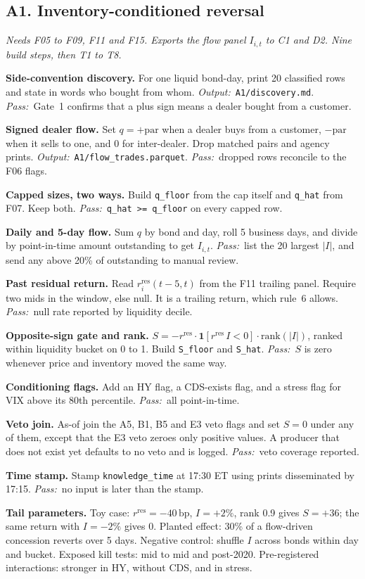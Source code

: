 \documentclass[11pt,letterpaper]{article}
\makeatletter
\newcommand{\code}[1]{\texttt{#1}}
\newcommand{\ind}[1]{\mathbf{1}\!\left[#1\right]}
\newcommand{\bp}{\,\mathrm{bp}}
\newcommand{\rres}{r^{\mathrm{res}}}      %
\newcommand*{\twodigit}[1]{\expandafter\@twodigit\csname c@#1\endcsname}
\newcommand*{\@twodigit}[1]{\ifnum#1<10 0\fi\number#1}
\newcommand{\stepname}[1]{\textbf{#1.}}
\newcommand{\Out}{\textit{Output:}~}
\newcommand{\Pass}{\textit{Pass:}~}
\makeatother
\begin{document}
\subsection{A1. Inventory-conditioned reversal}
\emph{Needs F05 to F09, F11 and F15. Exports the flow panel $I_{i,t}$ to C1 and D2. Nine build steps, then T1 to T8.}
\begin{ladder}[label=\textbf{A1.\twodigit*}]
\item \stepname{Side-convention discovery} For one liquid bond-day, print 20 classified rows and state in words who bought from whom. \Out \code{A1/discovery.md}. \Pass Gate~1 confirms that a plus sign means a dealer bought from a customer.
\item \stepname{Signed dealer flow} Set $q=+\mathrm{par}$ when a dealer buys from a customer, $-\mathrm{par}$ when it sells to one, and 0 for inter-dealer. Drop matched pairs and agency prints. \Out \code{A1/flow_trades.parquet}. \Pass dropped rows reconcile to the F06 flags.
\item \stepname{Capped sizes, two ways} Build \code{q_floor} from the cap itself and \code{q_hat} from F07. Keep both. \Pass \code{q_hat >= q_floor} on every capped row.
\item \stepname{Daily and 5-day flow} Sum $q$ by bond and day, roll 5 business days, and divide by point-in-time amount outstanding to get $I_{i,t}$. \Pass list the 20 largest $|I|$, and send any above 20\% of outstanding to manual review.
\item \stepname{Past residual return} Read $\rres_i(t-5,t)$ from the F11 trailing panel. Require two mids in the window, else null. It is a trailing return, which rule~6 allows. \Pass null rate reported by liquidity decile.
\item \stepname{Opposite-sign gate and rank} $S=-\rres\cdot\ind{\rres\,I<0}\cdot\mathrm{rank}(|I|)$, ranked within liquidity bucket on 0 to 1. Build \code{S_floor} and \code{S_hat}. \Pass $S$ is zero whenever price and inventory moved the same way.
\item \stepname{Conditioning flags} Add an HY flag, a CDS-exists flag, and a stress flag for VIX above its 80th percentile. \Pass all point-in-time.
\item \stepname{Veto join} As-of join the A5, B1, B5 and E3 veto flags and set $S=0$ under any of them, except that the E3 veto zeroes only positive values. A producer that does not exist yet defaults to no veto and is logged. \Pass veto coverage reported.
\item \stepname{Time stamp} Stamp \code{knowledge_time} at 17:30 ET using prints disseminated by 17:15. \Pass no input is later than the stamp.
\end{ladder}
\textbf{Tail parameters.} Toy case: $\rres=-40\bp$, $I=+2\%$, rank 0.9 gives $S=+36$; the same return with $I=-2\%$ gives 0. Planted effect: 30\% of a flow-driven concession reverts over 5 days. Negative control: shuffle $I$ across bonds within day and bucket. Exposed kill tests: mid to mid and post-2020. Pre-registered interactions: stronger in HY, without CDS, and in stress.
\end{document}
